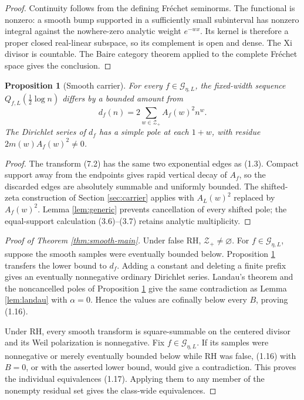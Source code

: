 \documentclass[11pt]{article}
\newtheorem{proposition}[theorem]{Proposition}
\newcommand{\cZ}{\mathcal Z}
\newcommand{\cG}{\mathcal G}
\begin{document}
\begin{proof}
Continuity follows from the defining Fr\'echet seminorms.  The functional is nonzero: a smooth
bump supported in a sufficiently small subinterval has nonzero integral against the nowhere-zero
analytic weight \(e^{-wx}\).  Its kernel is therefore a proper closed real-linear subspace, so its
complement is open and dense.  The Xi divisor is countable.  The Baire category theorem applied
to the complete Fr\'echet space gives the conclusion.
\end{proof}

\begin{proposition}[Smooth carrier]\label{prop:smooth-carrier}
For every \(f\in\cG_{\eta,L}\), the fixed-width sequence \(Q_{f,L}(\frac12\log n)\) differs by a
bounded amount from
\[
 d_f(n)=2\sum_{w\in\cZ_+}A_f(w)^2n^w.
\tag{7.4}
\]
The Dirichlet series of \(d_f\) has a simple pole at each \(1+w\), with residue
\(2m(w)A_f(w)^2\ne0\).
\end{proposition}

\begin{proof}
The transform (7.2) has the same two exponential edges as (1.3).  Compact support away from the
endpoints gives rapid vertical decay of \(A_f\), so the discarded edges are absolutely summable
and uniformly bounded.  The shifted-zeta construction of Section \ref{sec:carrier} applies with
\(A_L(w)^2\) replaced by \(A_f(w)^2\).  Lemma \ref{lem:generic} prevents cancellation of every
shifted pole; the equal-support calculation (3.6)--(3.7) retains analytic multiplicity.
\end{proof}

\begin{proof}[Proof of Theorem \ref{thm:smooth-main}]
Under false RH, \(\cZ_+\ne\varnothing\).  For \(f\in\cG_{\eta,L}\), suppose the smooth samples
were eventually bounded below.  Proposition \ref{prop:smooth-carrier} transfers the lower bound
to \(d_f\).  Adding a constant and deleting a finite prefix gives an eventually nonnegative
ordinary Dirichlet series.  Landau's theorem and the noncancelled poles of Proposition
\ref{prop:smooth-carrier} give the same contradiction as Lemma \ref{lem:landau} with
\(\alpha=0\).  Hence the values are cofinally below every \(B\), proving (1.16).

Under RH, every smooth transform is square-summable on the centered divisor and its Weil
polarization is nonnegative.  Fix \(f\in\cG_{\eta,L}\).  If its samples were nonnegative or merely
eventually bounded below while RH was false, (1.16) with \(B=0\), or with the asserted lower
bound, would give a contradiction.  This proves the individual equivalences (1.17).  Applying
them to any member of the nonempty residual set gives the class-wide equivalences.
\end{proof}
\end{document}
